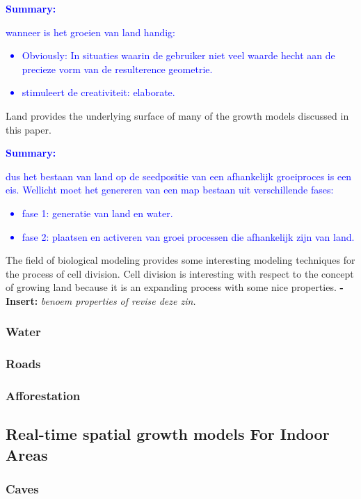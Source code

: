 \documentclass{article}
\newcommand{\inhoud}[1]{\textcolor{blue}{\textbf{\newline Summary: }\it{#1}}}
\newcommand{\voegtoe}[1]{\textcolor{MyDarkGreen}{\textbf{-Insert: }\it{#1}}}
\begin{document}
\inhoud
{wanneer is het groeien van land handig: 
\begin{itemize}
\item Obviously: In situaties waarin de gebruiker niet veel waarde hecht aan de precieze vorm van de resulterence geometrie.  
\item stimuleert de creativiteit: elaborate. 
\end{itemize}
}

Land provides the underlying surface of many of the growth models discussed in this paper. 

\inhoud
{dus het bestaan van land op de seedpositie van een afhankelijk groeiproces is een eis. Wellicht moet het genereren van een map bestaan uit verschillende fases:
\begin{itemize}
\item fase 1: generatie van land en water. 
\item fase 2: plaatsen en activeren van groei processen die afhankelijk zijn van land.  
\end{itemize}
}

The field of biological modeling provides some interesting modeling techniques for the process of cell division. 
Cell division is interesting with respect to the concept of growing land because it is an expanding process with some nice properties. \voegtoe{benoem properties of revise deze zin.} 


\subsubsection{Water} 

\subsubsection{Roads}

\subsubsection{Afforestation} 

\subsection{Real-time spatial growth models For Indoor Areas}

\subsubsection{Caves}
\end{document}
